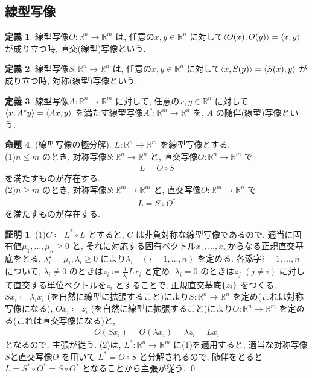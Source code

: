 \documentclass[twocolumn, landscape, a4paper , 8pt, fleqn, titlepage ]{jsarticle}
\theoremstyle{definition}
\newtheorem{dfn}{定義}[section]
\newtheorem{prop}[dfn]{命題}
\newtheorem*{pf*}{証明}
\newcommand{\cbra}[1]{\mleft\{#1\mright\}}
\newcommand{\tbra}[1]{\mleft\langle#1\mright\rangle}
\renewcommand{\-}{\hyphen}
\begin{document}
\subsection{線型写像}

\begin{dfn}
線型写像$O:\mathbb R^ n \rightarrow \mathbb R^m$ は, 任意の$x,y \in \mathbb R^n$ に対して$\tbra{O(x) , O(y)} = \tbra{x,y}$ が成り立つ時, 直交(線型)写像という.
\end{dfn}

\begin{dfn}
線型写像$S:\mathbb R^ n \rightarrow \mathbb R^n$ は, 任意の$x,y \in \mathbb R^n$ に対して$\tbra{x, S(y)} = \tbra{S(x), y}$ が成り立つ時, 対称(線型)写像という. 
\end{dfn}

\begin{dfn}
線型写像$A: \mathbb R^n \rightarrow \mathbb R^m$ に対して, 任意の$x,y \in \mathbb R^n$ に対して$\tbra{x, A^* y} = \tbra{Ax, y}$ を満たす線型写像$A^*:\mathbb R^m \rightarrow \mathbb R^n$ を, $A$ の随伴(線型)写像という.
\end{dfn}

\begin{prop}(線型写像の極分解).
$L:\mathbb R^n \rightarrow \mathbb R^m$ を線型写像とする. \\
(1)$n\leq m$ のとき, 対称写像$S:\mathbb R^n \rightarrow \mathbb R^n$ と, 直交写像$O:\mathbb R^ n \rightarrow \mathbb R^m$ で
\begin{align*} L = O \circ S \end{align*}
を満たすものが存在する. \\
(2)$n \geq m$ のとき, 対称写像$S:\mathbb R^m \rightarrow \mathbb R^m$ と, 直交写像$O:\mathbb R^ m \rightarrow \mathbb R^n$ で
\begin{align*} L = S \circ O^* \end{align*}
を満たすものが存在する.
\end{prop}
\begin{pf*}
(1)$C \coloneqq L^* \circ L$ とすると, $C$ は非負対称な線型写像であるので, 適当に固有値$\mu_1, \ldots , \mu_n \geq 0$ と, それに対応する固有ベクトル$x_1, \ldots , x_n$からなる正規直交基底をとる. $\lambda_i ^2= \mu_i, \lambda_i \geq 0$ により$\lambda_i \quad (i = 1, \ldots , n)$ を定める. 各添字$i = 1,\ldots, n$ について, $\lambda _i \neq 0$ のときは$z_i \coloneqq \frac{1}{\lambda_i} L x_i$ と定め, $\lambda_i = 0$ のときは$z_j\,\,(j \neq i)$ に対して直交する単位ベクトルを$z_i$ とすることで, 正規直交基底$\cbra{z_i}$ をつくる. $Sx_i \coloneqq \lambda_i x_i$ (を自然に線型に拡張すること)により$S:\mathbb R^n \rightarrow \mathbb R^n$ を定め(これは対称写像になる), $Ox_i \coloneqq z_i$ (を自然に線型に拡張すること)により$O:\mathbb R^n \rightarrow \mathbb R^m$ を定める(これは直交写像になる)と, 
\begin{align*} O(S x_i) = O(\lambda x_i) = \lambda z_i = L x_i \end{align*}
となるので, 主張が従う. (2)は, $L^*:\mathbb R^n \rightarrow \mathbb R^m$ に(1)を適用すると, 適当な対称写像$S$と直交写像$O$ を用いて $L^* = O \circ S $ と分解されるので, 随伴をとると$L = S^* \circ O^* = S \circ O^*$ となることから主張が従う. 
\qed
\end{pf*}
\end{document}
